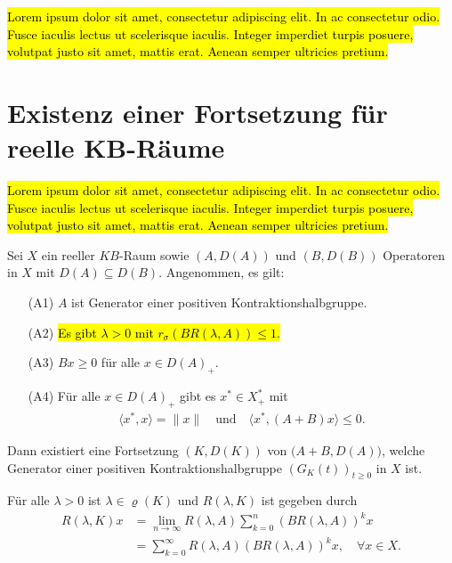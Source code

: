 \hl{Lorem ipsum dolor sit amet, consectetur adipiscing elit. In ac consectetur odio. Fusce iaculis lectus ut scelerisque iaculis. Integer imperdiet turpis posuere, volutpat justo sit amet, mattis erat. Aenean semper ultricies pretium.}



\section{Existenz einer Fortsetzung für reelle KB-Räume}

\hl{Lorem ipsum dolor sit amet, consectetur adipiscing elit. In ac consectetur odio. Fusce iaculis lectus ut scelerisque iaculis. Integer imperdiet turpis posuere, volutpat justo sit amet, mattis erat. Aenean semper ultricies pretium.}


\begin{fsatz}\cite{banasiak_lachowicz_2007}\label{Hauptaussage}
Sei $X$ ein reeller $KB$-Raum sowie $(A, D(A))$ und $(B, D(B))$ Operatoren in $X$ mit $D(A)\subseteq D(B)$. Angenommen, es gilt:
\begin{enumerate}
\item[\textnormal{(A1)}] $A$ ist Generator einer positiven Kontraktionshalbgruppe.
\item[\textnormal{(A2)}] \hl{Es gibt $\lambda >0$ mit $r_\sigma(BR(\lambda, A))\leq1$. }
\item[\textnormal{(A3)}] $Bx\geq0$ für alle $x\in D(A)_+$.
\item[\textnormal{(A4)}] Für alle $x\in D(A)_+$ gibt es $x^*\in X^*_+$ mit  
\begin{align*}
    \langle x^*, x\rangle = \|x\|\quad\text{und}\quad \langle x^*, (A+B)x\rangle\leq 0.
\end{align*}
\end{enumerate}
Dann existiert eine Fortsetzung $(K, D(K))$ von $\big(A+B, D(A)\big)$, welche Generator einer positiven Kontraktionshalbgruppe $(G_K(t))_{t\geq0}$ in $X$ ist. 

\par 
Für alle $\lambda >0$ ist $\lambda\in\varrho(K)$ und $R(\lambda, K)$ ist gegeben durch
\begin{align*}\label{Darstellung der Resolvente von K}
R(\lambda, K)x
&= \lim_{n\to\infty} R(\lambda, A)\sum_{k=0}^n (BR(\lambda, A))^k x\\
&=\sum_{k=0}^\infty R(\lambda, A)(BR(\lambda, A))^kx,\quad \forall x\in X.
\end{align*}
\end{fsatz}

